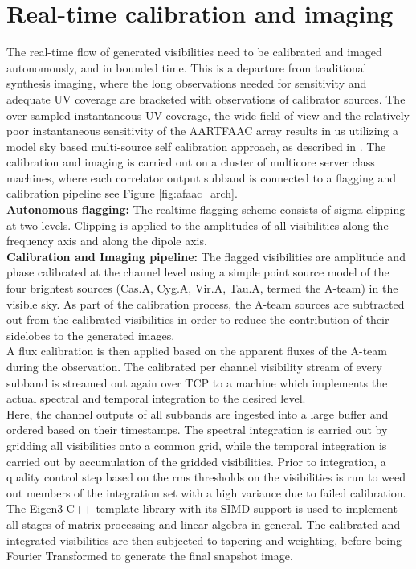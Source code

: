 \documentclass{ws-jai}
\begin{document}
\section {\label{sec:calim} Real-time calibration and imaging}
The real-time  flow of generated visibilities  need to be calibrated  and imaged
autonomously,  and  in bounded  time.   This  is  a departure  from  traditional
synthesis  imaging,  where the  long  observations  needed for  sensitivity  and
adequate UV coverage are bracketed  with observations of calibrator sources. The
over-sampled  instantaneous  UV  coverage,  the  wide  field  of  view  and  the
relatively poor  instantaneous sensitivity of  the AARTFAAC array results  in us
utilizing a model sky based multi-source self calibration approach, as described
in \cite  {prasad2014real}.  The  calibration and  imaging is  carried out  on a
cluster  of multicore  server class  machines, where each correlator output
subband is connected to a flagging and calibration pipeline see Figure
\ref{fig:afaac_arch}.\\

\noindent \textbf  {Autonomous flagging:} The realtime flagging scheme consists
of sigma clipping at two levels. Clipping is applied to the amplitudes of all
visibilities along the frequency axis and along the dipole axis. \\

\noindent \textbf  {Calibration and Imaging pipeline:}  The flagged
visibilities are amplitude  and phase calibrated  at the channel  level using a
simple point source model of  the four brightest sources (Cas.A, Cyg.A,  Vir.A,
Tau.A, termed the A-team) in the visible sky.  As  part of the calibration
process, the A-team sources are subtracted  out from the calibrated
visibilities in  order to reduce the  contribution  of  their  sidelobes   to
the  generated  images.\\  A  flux calibration is  then applied  based on  the
apparent fluxes  of the A-team during the  observation. The calibrated  per
channel visibility stream  of every subband is streamed out  again over TCP to
a machine  which implements the actual spectral and temporal integration to the
desired level.\\

Here, the channel outputs  of all subbands are ingested into  a large buffer and
ordered based on  their timestamps.  The spectral integration is  carried out by
gridding all visibilities onto a common  grid, while the temporal integration is
carried out by accumulation of the gridded visibilities. Prior to integration, a
quality control step based  on the rms thresholds on the  visibilities is run to
weed out  members of  the integration  set with  a high  variance due  to failed
calibration.  The Eigen3 \citep{eigenweb} C++ template library with its SIMD
support is  used to implement all stages of matrix processing and linear
algebra in general.  The calibrated and integrated visibilities are then
subjected  to tapering and weighting, before being Fourier  Transformed to
generate the final snapshot image.\\
\end{document}
